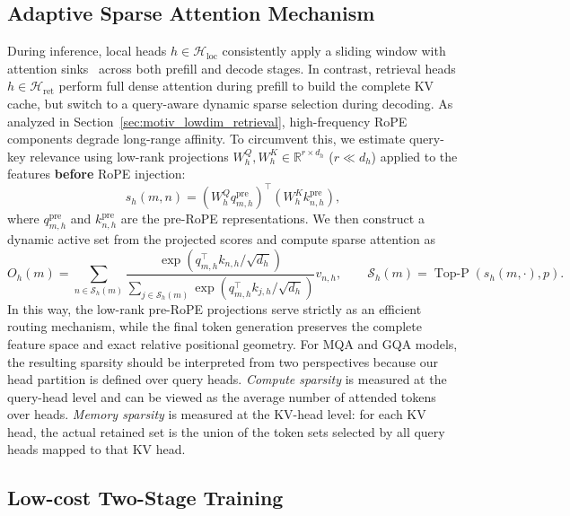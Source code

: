 \documentclass{llmxive}
\begin{document}
\subsection{Adaptive Sparse Attention Mechanism}\label{sec:adaptive_sparse_attention}
During inference, local heads $h \in \mathcal{H}_{\mathrm{loc}}$ consistently apply a sliding window with attention sinks~\citep{streamingLLM} across both prefill and decode stages. In contrast, retrieval heads $h \in \mathcal{H}_{\mathrm{ret}}$ perform full dense attention during prefill to build the complete KV cache, but switch to a query-aware dynamic sparse selection during decoding. As analyzed in Section~\ref{sec:motiv_lowdim_retrieval}, high-frequency RoPE components degrade long-range affinity. To circumvent this, we estimate query-key relevance using low-rank projections $W^Q_h, W^K_h \in \mathbb{R}^{r \times d_h}$ ($r \ll d_h$) applied to the features \textbf{before} RoPE injection:
\begin{equation}
    s_h(m,n) = (W^Q_h q_{m,h}^{\mathrm{pre}})^{\top} (W^K_h k_{n,h}^{\mathrm{pre}}),
\end{equation}
where $q_{m,h}^{\mathrm{pre}}$ and $k_{n,h}^{\mathrm{pre}}$ are the pre-RoPE representations. We then construct a dynamic active set from the projected scores and compute sparse attention as
\begin{equation}
O_h(m) = \sum_{n \in \mathcal{S}_h(m)} \frac{\exp(q_{m,h}^{\top} k_{n,h} / \sqrt{d_h})}{\sum_{j \in \mathcal{S}_h(m)} \exp(q_{m,h}^{\top} k_{j,h} / \sqrt{d_h})} v_{n,h}, \qquad \mathcal{S}_h(m) = \operatorname{Top\text{-}P}\!\left(s_h(m,\cdot), p\right).
\end{equation}
In this way, the low-rank pre-RoPE projections serve strictly as an efficient routing mechanism, while the final token generation preserves the complete feature space and exact relative positional geometry. For MQA and GQA models, the resulting sparsity should be interpreted from two perspectives because our head partition is defined over query heads. \emph{Compute sparsity} is measured at the query-head level and can be viewed as the average number of attended tokens over heads. \emph{Memory sparsity} is measured at the KV-head level: for each KV head, the actual retained set is the union of the token sets selected by all query heads mapped to that KV head.


\subsection{Low-cost Two-Stage Training}
\label{sec:two_stage_training}
\end{document}
